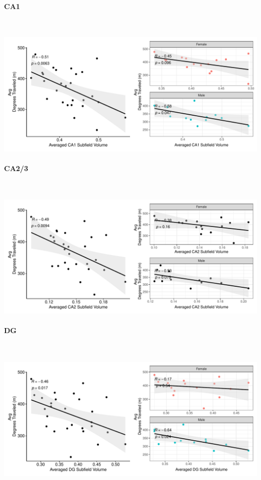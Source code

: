 \documentclass[
]{article}
\begin{document}
\paragraph{CA1}

~ \vspace{1cm}

\includegraphics{hippocampal_subfield_files/figure-latex/unnamed-chunk-15-1.pdf}

\paragraph{CA2/3}

~ \vspace{1cm}

\includegraphics{hippocampal_subfield_files/figure-latex/unnamed-chunk-16-1.pdf}

\paragraph{DG}

~ \vspace{1cm}

\includegraphics{hippocampal_subfield_files/figure-latex/unnamed-chunk-17-1.pdf}
\end{document}
